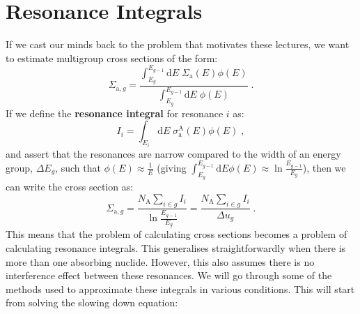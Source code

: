 \section{Resonance Integrals}

If we cast our minds back to the problem that motivates these lectures, we want to estimate multigroup cross sections of the form:
\begin{equation*}
    \Sigma_{\mathrm{a},g} = \frac{\int^{E_{g-1}}_{E_g}\mathrm{d}E\;\Sigma_\mathrm{a}(E)\phi(E)}{\int^{E_{g-1}}_{E_g}\mathrm{d}E\;\phi(E)}\;\mathrm{.}
\end{equation*}
If we define the \textbf{resonance integral} for resonance $i$ as: 
\begin{equation*}
    I_i = \int_{E_i}\mathrm{d}E\; \sigma^\mathrm{A}_\mathrm{a}(E)\phi(E)\;\mathrm{,}
\end{equation*}
and assert that the resonances are narrow compared to the width of an energy group, $\Delta E_g$, such that $\phi(E) \approx \frac{1}{E}$ (giving $\int^{E_{g-1}}_{E_g}\mathrm{d}E\phi(E) \approx \ln{\frac{E_{g-1}}{E_g}}$), then we can write the cross section as:
\begin{equation*}
    \Sigma_{\mathrm{a},g} = \frac{N_\mathrm{A}\sum_{i\in g}I_i}{\ln{\frac{E_{g-1}}{E_g}}} =\frac{N_\mathrm{A}\sum_{i\in g}I_i 
    }{\Delta u_g}\;\mathrm{.}
\end{equation*}
This means that the problem of calculating cross sections becomes a problem of calculating resonance integrals. This generalises straightforwardly when there is more than one absorbing nuclide. However, this also assumes there is no interference effect between these resonances. We will go through some of the methods used to approximate these integrals in various conditions. This will start from solving the slowing down equation:
